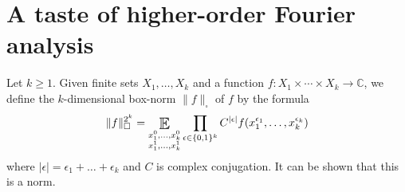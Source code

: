 \documentclass{article}
\DeclareMathOperator*{\E}{\scalerel*{\mathbb{E}}{\textstyle\sum}}
\newcommand{\1}[1]{\mathbbm{1}_{#1}}
\begin{document}
\section{A taste of higher-order Fourier analysis}
Let $k \geq 1$. Given finite sets $X_1, \dotsc, X_k$ and a function $f: X_1 \times \dotsb \times X_k \to \mathbb{C}$, we define the $k$-dimensional box-norm $\|f\|_\square$ of $f$ by the formula
\begin{equation*}
  \|f\|_\square^{2^k} = \E_{\substack{x_1^0, \dotsc, x_k^0\\x_1^1, \dotsc, x_k^1}} \prod_{\epsilon \in \{0,1\}^k} C^{|\epsilon|} f(x_1^{\epsilon_1}, \dotsc, x_k^{\epsilon_k})
\end{equation*}
where $|\epsilon| = \epsilon_1 + \dots + \epsilon_k$ and $C$ is complex conjugation.
It can be shown that this is a norm.
\end{document}
